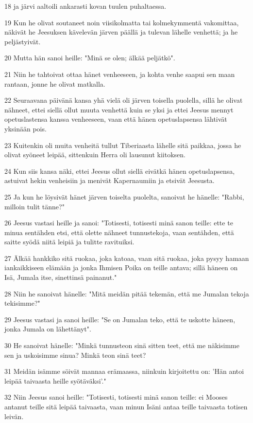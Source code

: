 \par 18 ja järvi aaltoili ankarasti kovan tuulen puhaltaessa.
\par 19 Kun he olivat soutaneet noin viisikolmatta tai kolmekymmentä vakomittaa, näkivät he Jeesuksen kävelevän järven päällä ja tulevan lähelle venhettä; ja he peljästyivät.
\par 20 Mutta hän sanoi heille: "Minä se olen; älkää peljätkö".
\par 21 Niin he tahtoivat ottaa hänet venheeseen, ja kohta venhe saapui sen maan rantaan, jonne he olivat matkalla.
\par 22 Seuraavana päivänä kansa yhä vielä oli järven toisella puolella, sillä he olivat nähneet, ettei siellä ollut muuta venhettä kuin se yksi ja ettei Jeesus mennyt opetuslastensa kanssa venheeseen, vaan että hänen opetuslapsensa lähtivät yksinään pois.
\par 23 Kuitenkin oli muita venheitä tullut Tiberiaasta lähelle sitä paikkaa, jossa he olivat syöneet leipää, sittenkuin Herra oli lausunut kiitoksen.
\par 24 Kun siis kansa näki, ettei Jeesus ollut siellä eivätkä hänen opetuslapsensa, astuivat hekin venheisiin ja menivät Kapernaumiin ja etsivät Jeesusta.
\par 25 Ja kun he löysivät hänet järven toiselta puolelta, sanoivat he hänelle: "Rabbi, milloin tulit tänne?"
\par 26 Jeesus vastasi heille ja sanoi: "Totisesti, totisesti minä sanon teille: ette te minua sentähden etsi, että olette nähneet tunnustekoja, vaan sentähden, että saitte syödä niitä leipiä ja tulitte ravituiksi.
\par 27 Älkää hankkiko sitä ruokaa, joka katoaa, vaan sitä ruokaa, joka pysyy hamaan iankaikkiseen elämään ja jonka Ihmisen Poika on teille antava; sillä häneen on Isä, Jumala itse, sinettinsä painanut."
\par 28 Niin he sanoivat hänelle: "Mitä meidän pitää tekemän, että me Jumalan tekoja tekisimme?"
\par 29 Jeesus vastasi ja sanoi heille: "Se on Jumalan teko, että te uskotte häneen, jonka Jumala on lähettänyt".
\par 30 He sanoivat hänelle: "Minkä tunnusteon sinä sitten teet, että me näkisimme sen ja uskoisimme sinua? Minkä teon sinä teet?
\par 31 Meidän isämme söivät mannaa erämaassa, niinkuin kirjoitettu on: 'Hän antoi leipää taivaasta heille syötäväksi'."
\par 32 Niin Jeesus sanoi heille: "Totisesti, totisesti minä sanon teille: ei Mooses antanut teille sitä leipää taivaasta, vaan minun Isäni antaa teille taivaasta totisen leivän.
